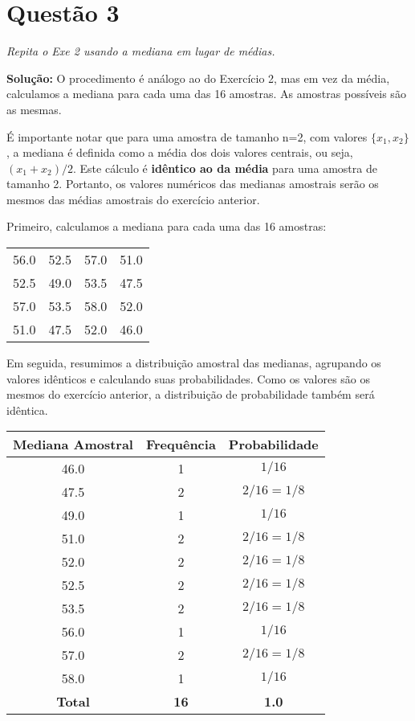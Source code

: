 \documentclass[12pt, a4paper]{article}
\begin{document}
\section*{Questão 3}
\textit{Repita o Exe 2 usando a mediana em lugar de médias.}

\textbf{Solução:}
O procedimento é análogo ao do Exercício 2, mas em vez da média, calculamos a mediana para cada uma das 16 amostras. As amostras possíveis são as mesmas.

É importante notar que para uma amostra de tamanho n=2, com valores $\{x_1, x_2\}$, a mediana é definida como a média dos dois valores centrais, ou seja, $(x_1 + x_2) / 2$. Este cálculo é \textbf{idêntico ao da média} para uma amostra de tamanho 2. Portanto, os valores numéricos das medianas amostrais serão os mesmos das médias amostrais do exercício anterior.

Primeiro, calculamos a mediana para cada uma das 16 amostras:
\begin{center}
\begin{tabular}{cccc}
    \toprule
    56.0 & 52.5 & 57.0 & 51.0 \\
    52.5 & 49.0 & 53.5 & 47.5 \\
    57.0 & 53.5 & 58.0 & 52.0 \\
    51.0 & 47.5 & 52.0 & 46.0 \\
    \bottomrule
\end{tabular}
\end{center}

Em seguida, resumimos a distribuição amostral das medianas, agrupando os valores idênticos e calculando suas probabilidades. Como os valores são os mesmos do exercício anterior, a distribuição de probabilidade também será idêntica.

\begin{center}
\begin{tabular}{ccc}
    \toprule
    \textbf{Mediana Amostral} & \textbf{Frequência} & \textbf{Probabilidade} \\
    \midrule
    46.0 & 1 & $1/16$ \\
    47.5 & 2 & $2/16 = 1/8$ \\
    49.0 & 1 & $1/16$ \\
    51.0 & 2 & $2/16 = 1/8$ \\
    52.0 & 2 & $2/16 = 1/8$ \\
    52.5 & 2 & $2/16 = 1/8$ \\
    53.5 & 2 & $2/16 = 1/8$ \\
    56.0 & 1 & $1/16$ \\
    57.0 & 2 & $2/16 = 1/8$ \\
    58.0 & 1 & $1/16$ \\
    \midrule
    \textbf{Total} & \textbf{16} & \textbf{1.0} \\
    \bottomrule
\end{tabular}
\end{center}
\end{document}
